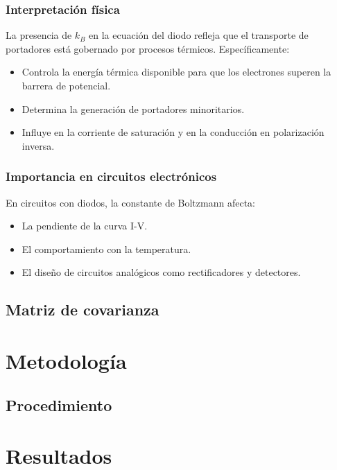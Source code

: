 \documentclass[twocolumn]{article} %
\begin{document}
\subsubsection{Interpretación física}

La presencia de $k_B$ en la ecuación del diodo refleja que el transporte de portadores está gobernado por procesos térmicos. Específicamente:

\begin{itemize}
    \item Controla la energía térmica disponible para que los electrones superen la barrera de potencial.
    \item Determina la generación de portadores minoritarios.
    \item Influye en la corriente de saturación y en la conducción en polarización inversa.
\end{itemize}

\subsubsection{Importancia en circuitos electrónicos}

En circuitos con diodos, la constante de Boltzmann afecta:

\begin{itemize}
    \item La pendiente de la curva I-V.
    \item El comportamiento con la temperatura.
    \item El diseño de circuitos analógicos como rectificadores y detectores.
\end{itemize}

\subsection{Matriz de covarianza}

\section{Metodología}

\subsection{Procedimiento}

\section{Resultados}
\end{document}
